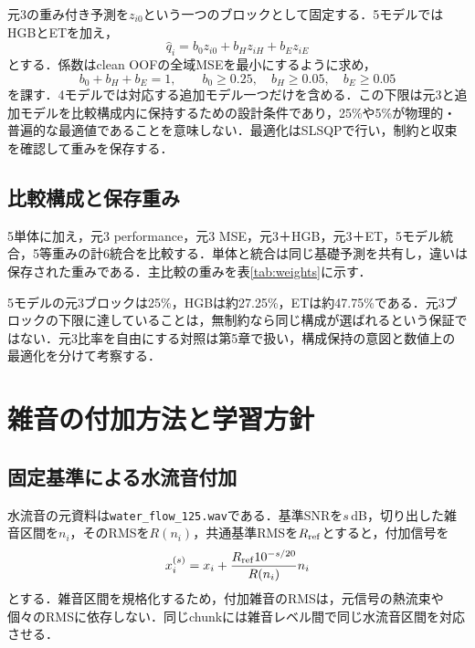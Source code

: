 元3の重み付き予測を$z_{i0}$という一つのブロックとして固定する．5モデルではHGBとETを加え，
\begin{equation}\label{eq:five}
 \hat q_i=b_0z_{i0}+b_Hz_{iH}+b_Ez_{iE}
\end{equation}
とする．係数はclean OOFの全域MSEを最小にするように求め，
\begin{equation}
 b_0+b_H+b_E=1,\qquad b_0\ge0.25,\quad b_H\ge0.05,\quad b_E\ge0.05
\end{equation}
を課す．4モデルでは対応する追加モデル一つだけを含める．この下限は元3と追加モデルを比較構成内に保持するための設計条件であり，25\%や5\%が物理的・普遍的な最適値であることを意味しない．最適化はSLSQPで行い，制約と収束を確認して重みを保存する．

\subsection{比較構成と保存重み}
5単体に加え，元3 performance，元3 MSE，元3＋HGB，元3＋ET，5モデル統合，5等重みの計6統合を比較する．単体と統合は同じ基礎予測を共有し，違いは保存された重みである．主比較の重みを表\ref{tab:weights}に示す．
\begin{table}[htbp]
\centering\small
\caption{全7条件で固定する個別モデルの重み [\%]．表示丸めにより総和が100とわずかに異なる場合がある．}
\label{tab:weights}

\end{table}

5モデルの元3ブロックは25\%，HGBは約27.25\%，ETは約47.75\%である．元3ブロックの下限に達していることは，無制約なら同じ構成が選ばれるという保証ではない．元3比率を自由にする対照は第5章で扱い，構成保持の意図と数値上の最適化を分けて考察する．

\section{雑音の付加方法と学習方針}
\subsection{固定基準による水流音付加}
水流音の元資料は\texttt{water\_flow\_125.wav}である．基準SNRを$s$\,dB，切り出した雑音区間を$n_i$，そのRMSを$R(n_i)$，共通基準RMSを$R_{\rm ref}$とすると，付加信号を
\begin{equation}\label{eq:noise}
 x_i^{(s)}=x_i+\frac{R_{\rm ref}10^{-s/20}}{R(n_i)}n_i
\end{equation}
とする．雑音区間を規格化するため，付加雑音のRMSは，元信号の熱流束や個々のRMSに依存しない．同じchunkには雑音レベル間で同じ水流音区間を対応させる．

